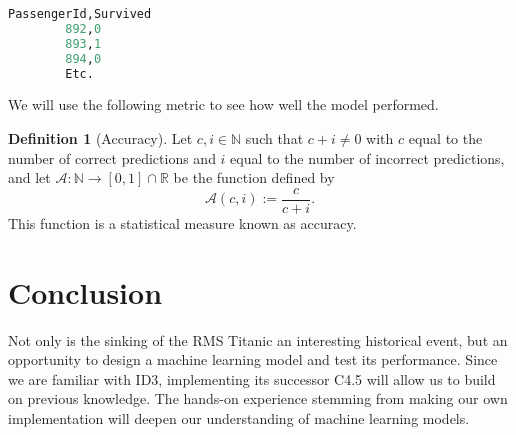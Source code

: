 \documentclass[12pt]{amsproc}
\newcommand\N{{\mathbb N}}
\newcommand\R{{\mathbb R}}
\theoremstyle{definition}
\newtheorem{definition}{Definition}
\begin{document}
	\begin{lstlisting}[language=Python, caption=Prediction example]
		PassengerId,Survived
		892,0
		893,1
		894,0
		Etc.\end{lstlisting}
		
	We will use the following metric to see how well the model performed.

	\begin{definition}[Accuracy]\label{definition:accuracy}
		Let $c,i \in \N$ such that $c + i \neq 0$ with $c$ equal to the number of correct predictions and $i$ equal to the number of incorrect predictions, and let $\mathscr{A}: \N \to [0,1] \cap \R$ be the function defined by   
		$$\mathscr{A}(c,i) := \frac{c}{c + i}.$$
		This function is a statistical measure known as accuracy. 
	\end{definition}
	
	\section{Conclusion}\label{conclusions}
	Not only is the sinking of the RMS Titanic an interesting historical event, but an opportunity to design a machine learning model and test its performance. Since we are familiar with ID3, implementing its successor C4.5 will allow us to build on previous knowledge. The hands-on experience stemming from making our own implementation will deepen our understanding of machine learning models.

		
	
	
	
	
\end{document}
